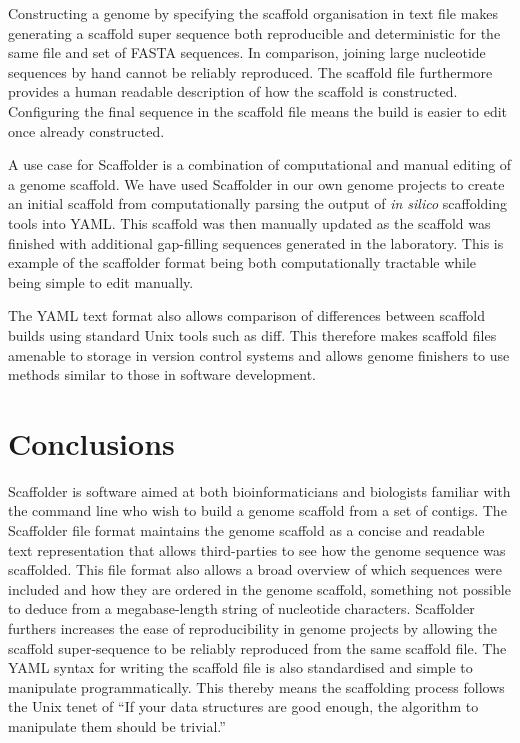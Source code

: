 \documentclass[10pt]{bmc_article}
\newenvironment{bmcformat}{\begin{raggedright}\baselineskip20pt\sloppy\setboolean{publ}{false}}{\end{raggedright}\baselineskip20pt\sloppy}
\begin{document}
\begin{bmcformat}
Constructing a genome by specifying the scaffold organisation in text file
makes generating a scaffold super sequence both reproducible and deterministic
for the same file and set of FASTA sequences. In comparison, joining large
nucleotide sequences by hand cannot be reliably reproduced. The scaffold file
furthermore provides a human readable description of how the scaffold is
constructed. Configuring the final sequence in the scaffold file means the
build is easier to edit once already constructed. \pb

A use case for Scaffolder is a combination of computational and manual editing
of a genome scaffold. We have used Scaffolder in our own genome projects to
create an initial scaffold from computationally parsing the output of \emph{in
silico} scaffolding tools into YAML. This scaffold was then manually updated as
the scaffold was finished with additional gap-filling sequences generated in
the laboratory. This is example of the scaffolder format being both
computationally tractable while being simple to edit manually. \pb

The YAML text format also allows comparison of differences between scaffold
builds using standard Unix tools such as diff. This therefore makes scaffold
files amenable to storage in version control systems and allows genome
finishers to use methods similar to those in software development. \pb 

\clearpage

\section*{Conclusions} %

Scaffolder is software aimed at both bioinformaticians and biologists familiar
with the command line who wish to build a genome scaffold from a set of
contigs. The Scaffolder file format maintains the genome scaffold as a concise
and readable text representation that allows third-parties to see how the
genome sequence was scaffolded. This file format also allows a broad overview
of which sequences were included and how they are ordered in the genome
scaffold, something not possible to deduce from a megabase-length string of
nucleotide characters. Scaffolder furthers increases the ease of
reproducibility in genome projects by allowing the scaffold super-sequence to
be reliably reproduced from the same scaffold file. The YAML syntax for writing
the scaffold file is also standardised and simple to manipulate
programmatically. This thereby means the scaffolding process follows the Unix
tenet of ``If your data structures are good enough, the algorithm to manipulate
them should be trivial.''


\end{bmcformat}
\end{document}
